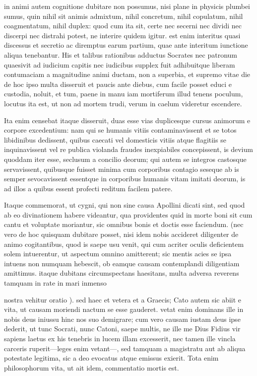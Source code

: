  in animi autem cognitione dubitare non possumus, nisi plane in physicis plumbei sumus, quin nihil sit animis admixtum, nihil concretum, nihil copulatum, nihil coagmentatum, nihil duplex: quod cum ita sit, certe nec secerni nec dividi nec discerpi nec distrahi potest, ne interire quidem igitur. est enim interitus quasi discessus et secretio ac diremptus earum partium, quae ante interitum iunctione aliqua tenebantur. His et talibus rationibus adductus Socrates nec patronum quaesivit ad iudicium capitis nec iudicibus supplex fuit adhibuitque liberam contumaciam a magnitudine animi ductam, non a superbia, et supremo vitae die de hoc ipso multa disseruit et paucis ante diebus, cum facile posset educi e custodia, noluit, et tum, paene in manu iam mortiferum illud tenens poculum, locutus ita est, ut non ad mortem trudi, verum in caelum videretur escendere.

 Ita enim censebat itaque disseruit, duas esse vias duplicesque cursus animorum e corpore excedentium: nam qui se humanis vitiis contaminavissent et se totos libidinibus dedissent, quibus caecati vel domesticis vitiis atque flagitiis se inquinavissent vel re publica violanda fraudes inexpiabiles concepissent, is devium quoddam iter esse, seclusum a concilio deorum; qui autem se integros castosque servavissent, quibusque fuisset minima cum corporibus contagio seseque ab is semper sevocavissent essentque in corporibus humanis vitam imitati deorum, is ad illos a quibus essent profecti reditum facilem patere.

 Itaque commemorat, ut cygni, qui non sine causa Apollini dicati sint, sed quod ab eo divinationem habere videantur, qua providentes quid in morte boni sit cum cantu et voluptate moriantur, sic omnibus bonis et doctis esse faciendum. (nec vero de hoc quisquam dubitare posset, nisi idem nobis accideret diligenter de animo cogitantibus, quod is saepe usu venit, qui cum acriter oculis deficientem solem intuerentur, ut aspectum omnino amitterent; sic mentis acies se ipsa intuens non numquam hebescit, ob eamque causam contemplandi diligentiam amittimus. itaque dubitans circumspectans haesitans, multa adversa reverens tamquam in rate in mari inmenso

 nostra vehitur oratio ). sed haec et vetera et a Graecis; Cato autem sic abiit e vita, ut causam moriendi nactum se esse gauderet. vetat enim dominans ille in nobis deus iniussu hinc nos suo demigrare; cum vero causam iustam deus ipse dederit, ut tunc Socrati, nunc Catoni, saepe multis, ne ille me Dius Fidius vir sapiens laetus ex his tenebris in lucem illam excesserit, nec tamen ille vincla carceris ruperit—leges enim vetant—, sed tamquam a magistratu aut ab aliqua potestate legitima, sic a deo evocatus atque emissus exierit. Tota enim philosophorum vita, ut ait idem, commentatio mortis est.

